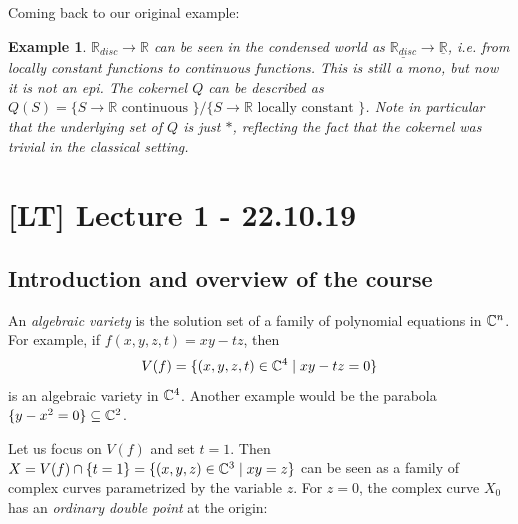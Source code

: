 \documentclass[A4paper, british, reqno]{amsart}
\theoremstyle{darkgreentheorem}
\theoremstyle{darkbluedefinition}
\theoremstyle{darkredexample}
\newtheorem{exa}[thm]{Example}
\theoremstyle{remark}
\newcommand{\1}{\mathbbm{1}}
\renewcommand{\u}[1]{\underline{#1}}
\begin{document}
Coming back to our original example:

\begin{exa}
    $\mathbb{R}_{disc}\to \mathbb{R}$ can be seen in the condensed world as $\u{\mathbb{R}_{disc}}\to \u{\mathbb{R}}$, i.e. from locally constant functions to continuous functions.
    This is still a mono, but now it is not an epi.
    The cokernel $Q$ can be described as $Q(S)=\{ S\to \mathbb{R}\text{ continuous }\}/\{ S\to \mathbb{R}\text{ locally constant }\}$.
    Note in particular that the underlying set of $Q$ is just $*$, reflecting the fact that the cokernel was trivial in the classical setting.
\end{exa}

\section{[LT] Lecture 1 - 22.10.19}

\subsection{Introduction and overview of the course}

An \textit{algebraic variety} is the solution set of a family of polynomial equations in $\mathbb{C}^{n}$.
For example, if $f(x,y,z,t)=xy-tz$, then
\[ V(f)=\{(x,y,z,t)\in \mathbb{C}^{4}\mid xy-tz=0\} \]
is an algebraic variety in $\mathbb{C}^{4}$.
Another example would be the parabola $\{ y-x^{2}=0\}\subseteq \mathbb{C}^{2}$.

Let us focus on $V(f)$ and set $t=1$.
Then $X=V(f)\cap \{ t=1 \}=\{(x,y,z)\in \mathbb{C}^{3}\mid xy=z\}$ can be seen as a family of complex curves parametrized by the variable $z$.
For $z=0$, the complex curve $X_{0}$ has an \textit{ordinary double point} at the origin:
\end{document}
